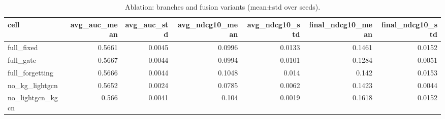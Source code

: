 \begin{table}[t]
\centering
\caption{Ablation: branches and fusion variants (mean$\pm$std over seeds).}
\label{tab:ablation}
\begin{tabular}{lrrrrrr}
\toprule
cell & avg\_auc\_mean & avg\_auc\_std & avg\_ndcg10\_mean & avg\_ndcg10\_std & final\_ndcg10\_mean & final\_ndcg10\_std \\
\midrule
full\_fixed & 0.5661 & 0.0045 & 0.0996 & 0.0133 & 0.1461 & 0.0152 \\
full\_gate & 0.5667 & 0.0044 & 0.0994 & 0.0101 & 0.1284 & 0.0051 \\
full\_forgetting & 0.5666 & 0.0044 & 0.1048 & 0.014 & 0.142 & 0.0153 \\
no\_kg\_lightgcn & 0.5652 & 0.0024 & 0.0785 & 0.0062 & 0.1423 & 0.0044 \\
no\_lightgcn\_kgcn & 0.566 & 0.0041 & 0.104 & 0.0019 & 0.1618 & 0.0152 \\
\bottomrule
\end{tabular}
\end{table}
